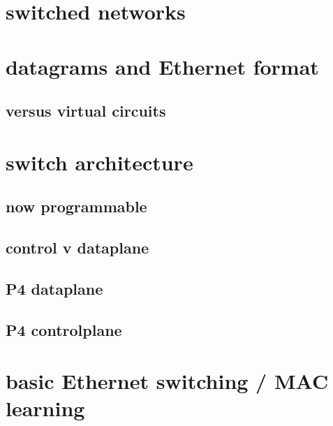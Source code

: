 \date{}
\title{}
\date{}

\begin{frame}
    \titlepage
\end{frame}

\section{switched networks}



\section{datagrams and Ethernet format}




\subsection{versus virtual circuits}



\section{switch architecture}

\subsection{now programmable}


\subsection{control v dataplane}


\subsection{P4 dataplane}


\subsection{P4 controlplane}


\section{basic Ethernet switching / MAC learning}

